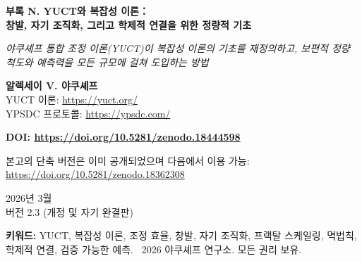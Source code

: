 \documentclass[11pt,a4paper]{article}
\theoremstyle{remark}
\newcommand{\Keff}{K_{\mathrm{eff}}}
\begin{document}
	
	\begin{titlepage} 
		\centering
		\vspace*{0cm}
		{\Huge\textbf{부록 N. YUCT와 복잡성 이론：\\ 창발, 자기 조직화, 그리고 학제적 연결을 위한 정량적 기초}\par}
		\vspace{1.2cm}
		{\small\textit{야쿠셰프 통합 조정 이론(YUCT)이 복잡성 이론의 기초를 재정의하고, 보편적 정량 척도와 예측력을 모든 규모에 걸쳐 도입하는 방법}}\par
		\vspace{1.2cm}
		{\small\textbf{알렉세이 V. 야쿠셰프} \\}
		YUCT 이론: \url{https://yuct.org/}\\
		YPSDC 프로토콜: \url{https://ypsdc.com/}\par
		\vspace{2cm}
		\textbf{DOI: \url{https://doi.org/10.5281/zenodo.18444598}}\par
		\vspace{1cm}
		본고의 단축 버전은 이미 공개되었으며 다음에서 이용 가능: \\ \url{https://doi.org/10.5281/zenodo.18362308}\par
		\vspace{1cm}
		2026년 3월 \\ 버전 2.3 (개정 및 자기 완결판)\par
		\newpage
		\begin{abstract}
			\noindent
			본 부록은 야쿠셰프 통합 조정 이론(YUCT)이 복잡성 이론을 정성적 개념(창발, 자기 조직화, 멱법칙)의 집합에서 정량적이고 예측적인 과학으로 변모시키는 방법에 대한 체계적인 설명을 제시한다. 주요 요소: (i) 조정 효율 \(\Keff\)를 시스템 조직화의 보편적 척도로 하고, 통일된 조작적 정의를 부여한다; (ii) 지수 \(\beta = 0.67\)을 갖는 기본적 오차 스케일링 법칙 \(\varepsilon = \kappa_c \alpha \Keff^{-\beta}\) (부록 L에서 유도되고 여기서 요약됨)이 영역을 초월한 멱법칙의 기원을 설명한다; (iii) YPSDC 프로토콜이 사전과 인덱스의 분리를 통해 자기 조직화의 메커니즘을 밝힌다; (iv) 120 섹터와 7140개의 결합 \(\kappa_{sr}\)을 가진 19차원 기하학(부록 A)이 학제적 모델링을 위한 수학적 구조를 제공한다; (v) 원자 결합 에너지에서 우주 마이크로파 배경 복사 요동까지, 50자릿수 이상에 걸친 경험적 검증의 자기 완결적 요약; (vi) 화학, 생물학, 경제학, 의식 연구에서의 구체적이고 검증 가능한 예측. 본 부록은 새로운 성질의 창발이 임계 \(\Keff\) 값의 달성에 대응하며, 그것이 이론적으로 예측 가능함을 보인다. 물리적, 생물학적, 사회적, 인지적 시스템에서의 복잡성을 기술하기 위한 통일된 언어를 제공하고, 새로운 과학 분야인 \textbf{조정 시스템학}의 기초를 닦는다.
		\end{abstract}
		\vspace{0.5cm}
		\noindent
		{\small\textbf{키워드:}} YUCT, 복잡성 이론, 조정 효율, 창발, 자기 조직화, 프랙탈 스케일링, 멱법칙, 학제적 연결, 검증 가능한 예측.
		\vspace{0.2cm}
		\noindent
		\textcopyright\ 2026 야쿠셰프 연구소. 모든 권리 보유.
	\end{titlepage}
	
\end{document}

